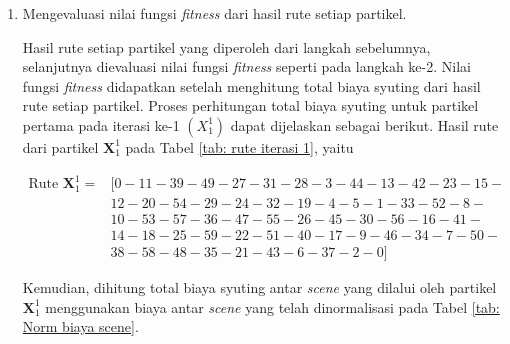 {{\begin{enumerate}[align = left, left = 0cm, nolistsep]
        \item Mengevaluasi nilai fungsi \textit{fitness} dari hasil rute setiap partikel. \par \nobreak
              Hasil rute setiap partikel yang diperoleh dari langkah sebelumnya, selanjutnya dievaluasi nilai fungsi \textit{fitness} seperti pada langkah ke-2.
              Nilai fungsi \textit{fitness} didapatkan setelah menghitung total biaya syuting dari hasil rute setiap partikel.
              Proses perhitungan total biaya syuting untuk partikel pertama pada iterasi ke-1 $(X_{1}^{1})$ dapat dijelaskan sebagai berikut. \newline
              Hasil rute dari partikel $\boldsymbol{X}_{1}^{1}$ pada Tabel \ref{tab: rute iterasi 1}, yaitu

                  {%
                      \begin{equation*}
                          \begin{aligned}
                              \text{Rute $\boldsymbol{X}_{1}^{1}$} = & [0-11-39-49-27-31-28-3-44-13-42-23-15- \\
                                                        & 12-20-54-29-24-32-19-4-5-1-33-52-8-    \\
                                                        & 10-53-57-36-47-55-26-45-30-56-16-41-   \\
                                                        & 14-18-25-59-22-51-40-17-9-46-34-7-50-  \\
                                                        & 38-58-48-35-21-43-6-37-2-0]
                          \end{aligned}
                      \end{equation*}
                  }

              Kemudian, dihitung total biaya syuting antar \textit{scene} yang dilalui oleh partikel $\boldsymbol{X}_{1}^{1}$ menggunakan biaya antar \textit{scene} yang telah dinormalisasi pada Tabel \ref{tab: Norm biaya scene}.


\end{enumerate}}}
